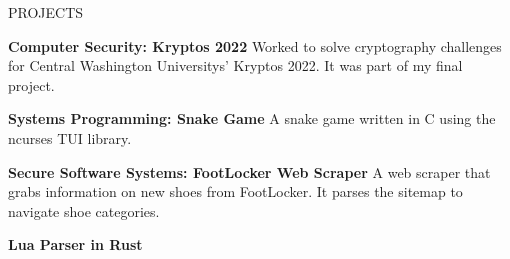 \documentclass{resume}
\begin{document}
\begin{rSection}{PROJECTS}
	\vspace{-1.25em}
	\item \textbf{Computer Security: Kryptos 2022} {Worked to solve cryptography challenges for Central
		Washington Universitys' Kryptos 2022. It was part of my final project.}
	\item \textbf{Systems Programming: Snake Game} {A snake game written in C using the ncurses TUI library.}
	\item \textbf{Secure Software Systems: FootLocker Web Scraper} {A web scraper that grabs information on new
		shoes from FootLocker. It parses the sitemap to navigate shoe categories.}
	\item \textbf{Lua Parser in Rust} {}
\end{rSection}

\end{document}
